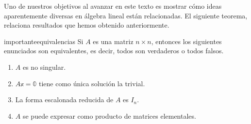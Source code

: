 Uno de nuestros objetivos al avanzar en este texto es mostrar cómo ideas aparentemente diversas en álgebra lineal están relacionadas. El siguiente teorema, relaciona resultados que hemos obtenido anteriormente.

\begin{theorem}{}{importanteequivalencias}
    Si $A$ es una matriz $n \times n$, entonces los siguientes enunciados son equivalentes, es decir, todos son verdaderos o todos falsos.
    \begin{enumerate}[label=\alph*), topsep=6pt, itemsep=0pt]
        \item $A$ es no singular.
        \item $A\mathbb{x} = \mathbb{0}$ tiene como única solución la trivial.
        \item La forma escalonada reducida de $A$ es $I_n$.
        \item $A$ se puede expresar como producto de matrices elementales.
    \end{enumerate}


\end{theorem}
